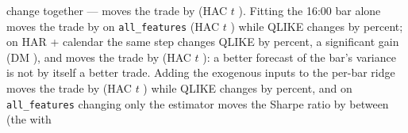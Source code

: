 change together --- moves the trade by \cmLdSpec{} (HAC $t$ \cmLdSpecT). Fitting the %
16:00 bar alone moves the trade by \cmLdPerBarAll{} on \texttt{all\_features} (HAC $t$ %
\cmLdPerBarAllT) while QLIKE changes by \cmLdPerBarAllQ{} percent; on HAR + calendar the
same step changes QLIKE by \cmLdPerBarBaseQ{} percent, a significant gain (DM %
\cmLdPerBarBaseDM), and moves the trade by \cmLdPerBarBase{} (HAC $t$
\cmLdPerBarBaseT): a better forecast of the bar's variance is not by itself a better
trade. Adding the exogenous inputs to the per-bar ridge moves the trade by \cmLdIn{} (HAC $t$ %
\cmLdInT) while QLIKE changes by \cmLdInQ{} percent, and on \texttt{all\_features} changing
only the estimator moves the Sharpe ratio by between \cmLdEstMin{} (the \cmLdEstMinWho{} with %

